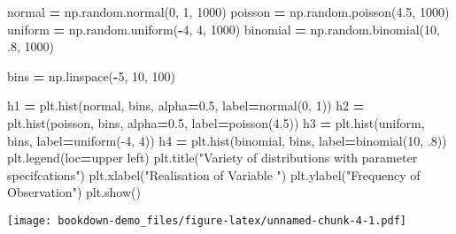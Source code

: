 \documentclass[
]{book}
\newenvironment{Shaded}{\begin{snugshade}}{\end{snugshade}}
\newcommand{\DecValTok}[1]{\textcolor[rgb]{0.00,0.00,0.81}{#1}}
\newcommand{\FloatTok}[1]{\textcolor[rgb]{0.00,0.00,0.81}{#1}}
\newcommand{\NormalTok}[1]{#1}
\newcommand{\OperatorTok}[1]{\textcolor[rgb]{0.81,0.36,0.00}{\textbf{#1}}}
\newcommand{\StringTok}[1]{\textcolor[rgb]{0.31,0.60,0.02}{#1}}
\theoremstyle{definition}
\theoremstyle{definition}
\theoremstyle{definition}
\theoremstyle{remark}
\begin{document}
\begin{Shaded}
\begin{Highlighting}[]
\NormalTok{normal }\OperatorTok{=}\NormalTok{ np.random.normal(}\DecValTok{0}\NormalTok{, }\DecValTok{1}\NormalTok{, }\DecValTok{1000}\NormalTok{)}
\NormalTok{poisson }\OperatorTok{=}\NormalTok{ np.random.poisson(}\FloatTok{4.5}\NormalTok{, }\DecValTok{1000}\NormalTok{)}
\NormalTok{uniform }\OperatorTok{=}\NormalTok{ np.random.uniform(}\OperatorTok{{-}}\DecValTok{4}\NormalTok{, }\DecValTok{4}\NormalTok{, }\DecValTok{1000}\NormalTok{)}
\NormalTok{binomial }\OperatorTok{=}\NormalTok{ np.random.binomial(}\DecValTok{10}\NormalTok{, }\FloatTok{.8}\NormalTok{, }\DecValTok{1000}\NormalTok{)}

\NormalTok{bins }\OperatorTok{=}\NormalTok{ np.linspace(}\OperatorTok{{-}}\DecValTok{5}\NormalTok{, }\DecValTok{10}\NormalTok{, }\DecValTok{100}\NormalTok{)}

\NormalTok{h1 }\OperatorTok{=}\NormalTok{ plt.hist(normal, bins, alpha}\OperatorTok{=}\FloatTok{0.5}\NormalTok{, label}\OperatorTok{=}\StringTok{\textquotesingle{}normal(0, 1)\textquotesingle{}}\NormalTok{)}
\NormalTok{h2 }\OperatorTok{=}\NormalTok{ plt.hist(poisson, bins, alpha}\OperatorTok{=}\FloatTok{0.5}\NormalTok{, label}\OperatorTok{=}\StringTok{\textquotesingle{}poisson(4.5)\textquotesingle{}}\NormalTok{)}
\NormalTok{h3 }\OperatorTok{=}\NormalTok{ plt.hist(uniform, bins, label}\OperatorTok{=}\StringTok{\textquotesingle{}uniform({-}4, 4)\textquotesingle{}}\NormalTok{)}
\NormalTok{h4 }\OperatorTok{=}\NormalTok{ plt.hist(binomial, bins, label}\OperatorTok{=}\StringTok{\textquotesingle{}binomial(10, .8)\textquotesingle{}}\NormalTok{)}
\NormalTok{plt.legend(loc}\OperatorTok{=}\StringTok{\textquotesingle{}upper left\textquotesingle{}}\NormalTok{)}
\NormalTok{plt.title(}\StringTok{"Variety of distributions with parameter specifcations"}\NormalTok{)}
\NormalTok{plt.xlabel(}\StringTok{"Realisation of Variable "}\NormalTok{)}
\NormalTok{plt.ylabel(}\StringTok{"Frequency of Observation"}\NormalTok{)}
\NormalTok{plt.show()}
\end{Highlighting}
\end{Shaded}

\texttt{[image: bookdown-demo\_files/figure-latex/unnamed-chunk-4-1.pdf]}
\end{document}
